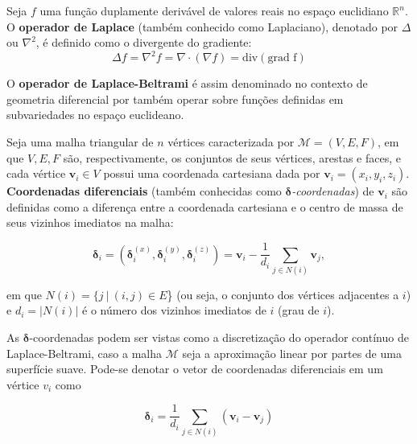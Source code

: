 \begin{defi}
Seja $f$ uma função duplamente derivável de valores reais no espaço euclidiano $\mathbb{R}^n$. O \textbf{operador de Laplace} (também conhecido como Laplaciano), denotado por $\Delta$ ou $\nabla^2$, é definido como o divergente do gradiente:
\begin{equation}
\Delta f = \nabla^2 f = \nabla \cdot (\nabla f) = \text{div} (\text{grad f})
\end{equation}
\end{defi}

O \textbf{operador de Laplace-Beltrami} é assim denominado no contexto de geometria diferencial por também operar sobre funções definidas em subvariedades no espaço euclideano.

\begin{defi}
	Seja uma malha triangular de $n$ vértices caracterizada por $\mathcal{M} = (V, E, F)$, em que $V, E, F$ são, respectivamente, os conjuntos de seus vértices, arestas e faces, e cada vértice $\mathbf{v}_i \in V$ possui uma coordenada cartesiana dada por $\mathbf{v}_i = (x_i,y_i,z_i)$. \textbf{Coordenadas diferenciais} (também conhecidas como $\mathbf{\delta}$\textit{-coordenadas}) de $\mathbf{v}_i$ são definidas como a diferença entre a coordenada cartesiana e o centro de massa de seus vizinhos imediatos na malha:
	
	\begin{equation}
	\mathbf{\delta}_i = (\mathbf{\delta}_i^{(x)}, \mathbf{\delta}_i^{(y)}, \mathbf{\delta}_i^{(z)}) = \mathbf{v}_i - \frac{1}{d_i} \sum_{j \in N(i)} \mathbf{v}_j,
	\label{eq_delta}
	\end{equation}
	
	\noindent em que $N(i) = \{j\ |\ (i,j) \in E$\} (ou seja, o conjunto dos vértices adjacentes a $i$) e $d_i = |N(i)|$ é o número dos vizinhos imediatos de $i$ (grau de $i$).
\end{defi}

As $\mathbf{\delta}$-coordenadas podem ser vistas como a discretização do operador contínuo de Laplace-Beltrami, caso a malha $\mathcal{M}$ seja a aproximação linear por partes de uma superfície suave. Pode-se denotar o vetor de coordenadas diferenciais em um vértice $v_i$ como

\begin{equation}
\mathbf{\delta}_i = \frac{1}{d_i} \sum_{j \in N(i)} (\mathbf{v}_i - \mathbf{v}_j)
\end{equation}

